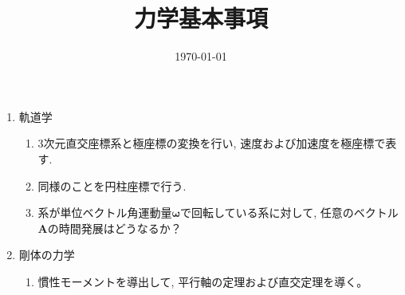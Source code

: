 \documentclass[11pt,a4paper]{jarticle}
\title{力学基本事項}
\author{}
\date{\today}
\begin{document}
\maketitle
\begin{enumerate}
    \item 軌道学
    \begin{enumerate}
        \item 3次元直交座標系と極座標の変換を行い, 速度および加速度を極座標で表す.
        \item 同様のことを円柱座標で行う.
        \item 系が単位ベクトル角運動量$\bm{ω}$で回転している系に対して, 任意のベクトル$\bm{A}$の時間発展はどうなるか？
    \end{enumerate}
    \item 剛体の力学
    \begin{enumerate}
        \item 慣性モーメントを導出して, 平行軸の定理および直交定理を導く。
    \end{enumerate}
\end{enumerate}
\end{document}
